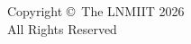 \newpage
\thispagestyle{empty}
\vspace*{12cm}
\begin{center}
Copyright \copyright\ The LNMIIT 2026\\
All Rights Reserved
\end{center}
\clearpage
